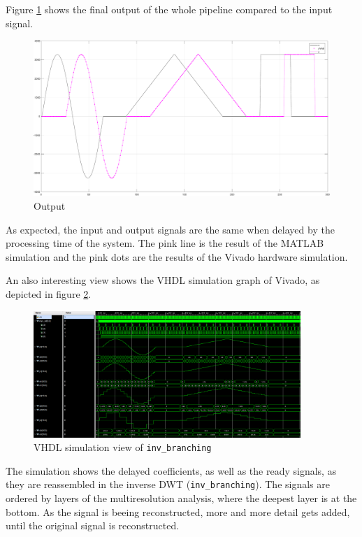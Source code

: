\begin{refsection}
Figure \ref{fpga:fig:output} shows the final output of the whole pipeline compared to the input signal. 
\begin{figure}
	\centering
	\includegraphics[width=\textwidth]{papers/fpga/images/output_with_step.pdf}
	\caption{Output \label{fpga:fig:output}}
\end{figure}
As expected, the input and output signals are the same when delayed by the processing time of the system.
The pink line is the result of the MATLAB simulation and the pink dots are the results of the Vivado hardware simulation. 

An also interesting view shows the VHDL simulation graph of Vivado, as depicted in figure \ref{fpga:fig:sim}.
\begin{figure}
	\centering
	\includegraphics[width=0.9\textwidth]{papers/fpga/images/inv_branching_screenshot.PNG}
	\caption{VHDL simulation view of \texttt{inv\_branching} \label{fpga:fig:sim}}
\end{figure}
The simulation shows the delayed coefficients, as well as the ready signals, as they are reassembled in the inverse DWT (\texttt{inv\_branching}).
The signals are ordered by layers of the multiresolution analysis, where the deepest layer is at the bottom.
As the signal is beeing reconstructed, more and more detail gets added, until the original signal is reconstructed.


\end{refsection}
